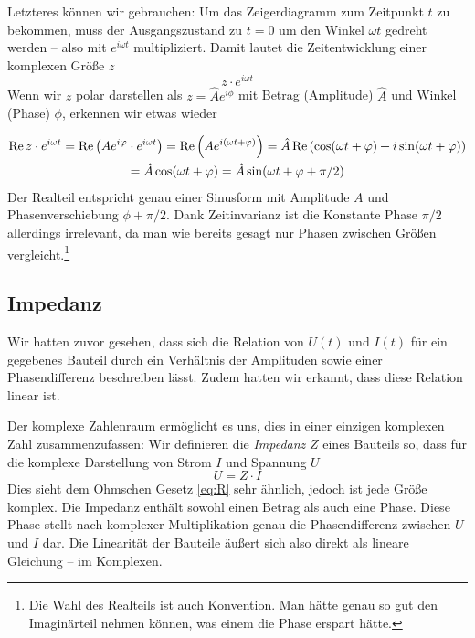 Letzteres können wir gebrauchen: Um das Zeigerdiagramm zum Zeitpunkt $t$ zu bekommen, muss der Ausgangszustand zu $t=0$
um den Winkel $\omega t$ gedreht werden -- also mit $e^{i\omega t}$ multipliziert. Damit lautet die Zeitentwicklung
einer komplexen Größe $z$
\begin{equation}
    z\cdot e^{i\omega t}
\end{equation}
Wenn wir $z$ polar darstellen als $z = \hat A e^{i\phi}$ mit Betrag (Amplitude) $\hat A$ und Winkel (Phase) $\phi$, erkennen wir
etwas wieder

\begin{gather*}
\Re z\cdot e^{i\omega t}
    = \Re\qty(Ae^{i\varphi} \cdot e^{i\omega t})
    = \Re\qty(Ae^{i(\omega t + \varphi)})
    = \hat A\Re\qty(\cos(\omega t + \varphi) + i\sin(\omega t + \varphi)) \\
    = \hat A\cos(\omega t  +\varphi)
    = \hat A\sin(\omega t + \varphi + \pi/2)
\end{gather*}
Der Realteil entspricht genau einer Sinusform mit Amplitude $A$ und Phasenverschiebung $\phi+\pi/2$. Dank Zeitinvarianz
ist die Konstante Phase $\pi/2$ allerdings irrelevant, da man wie bereits gesagt nur Phasen zwischen Größen
vergleicht.\footnote{Die Wahl des Realteils ist auch Konvention. Man hätte genau so gut den Imaginärteil nehmen können,
was einem die Phase erspart hätte.}
\subsection{Impedanz}
Wir hatten zuvor gesehen, dass sich die Relation von $U(t)$ und $I(t)$ für ein gegebenes Bauteil durch ein Verhältnis
der Amplituden sowie einer Phasendifferenz beschreiben lässt. Zudem hatten wir erkannt, dass diese Relation linear ist.

Der komplexe Zahlenraum ermöglicht es uns, dies in einer einzigen komplexen Zahl zusammenzufassen: Wir definieren die
\emph{Impedanz} $Z$ eines Bauteils so, dass für die komplexe Darstellung von Strom $I$ und Spannung $U$
\begin{equation}\label{eq:impedanz}
    U = Z \cdot I
\end{equation}
Dies sieht dem Ohmschen Gesetz \eqref{eq:R} sehr ähnlich, jedoch ist jede Größe komplex. Die Impedanz enthält sowohl
einen Betrag als auch eine Phase. Diese Phase stellt nach komplexer Multiplikation genau die Phasendifferenz zwischen
$U$ und $I$ dar. Die Linearität der Bauteile äußert sich also direkt als lineare Gleichung -- im Komplexen.

